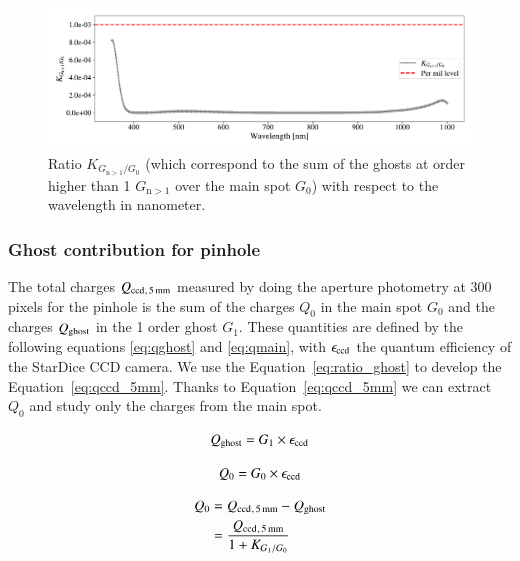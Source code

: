 \begin{figure}[h]
    \centering
    \includegraphics[width=\columnwidth]{fig/ratio_g1_ginf.pdf}
    \caption{Ratio $K_{G_{\mathrm{n}>1}/G_0}$ (which correspond to the sum of the ghosts at order higher than 1 $G_{\mathrm{n}>1}$ over the main spot $G_0$) with respect to the wavelength in nanometer.}
    \label{fig:ratio_ginf_g0}
\end{figure}

\subsubsection{Ghost contribution for \bpinhole pinhole}

The total charges $Q_{\mathrm{ccd}}{}_{, \, \SI{5}{\milli\meter}}$ measured by doing the aperture photometry at 300 pixels for the \bpinhole pinhole is the sum of the charges $Q_0$ in the main spot $G_0$ and the charges $Q_{\mathrm{ghost}}$ in the 1 order ghost $G_1$. These quantities are defined by the following equations \ref{eq:qghost} and \ref{eq:qmain}, with $\epsilon_{\mathrm{ccd}}$ the quantum efficiency of the StarDice CCD camera. We use the Equation~\ref{eq:ratio_ghost} to develop the Equation~\ref{eq:qccd_5mm}. Thanks to Equation~\ref{eq:qccd_5mm} we can extract $Q_0$ and study only the charges from the main spot.

\begin{equation}
    Q_{\mathrm{ghost}} = G_1 \times \epsilon_{\mathrm{ccd}}
    \label{eq:qghost}
\end{equation}

\begin{equation}
    Q_0 = G_0 \times \epsilon_{\mathrm{ccd}}
    \label{eq:qmain}
\end{equation}

\begin{equation}
\begin{aligned}
    Q_0 & = Q_{\mathrm{ccd}}{}_{, \, \SI{5}{\milli\meter}} - Q_{\mathrm{ghost}} \\
    & = \frac{Q_{\mathrm{ccd}}{}_{, \, \SI{5}{\milli\meter}}}{1 + K_{G_1/G_0}}
    \label{eq:qccd_5mm}
\end{aligned}
\end{equation}

